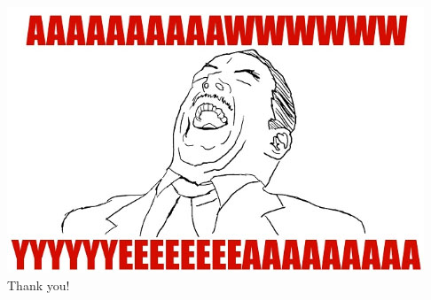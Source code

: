 \documentclass[compress]{beamer}
\begin{document}
\begin{frame}
\begin{center}
\includegraphics[width = \textwidth]{AwwYeah.jpg} \\
Thank you!
\end{center}
\end{frame}
\end{document}
